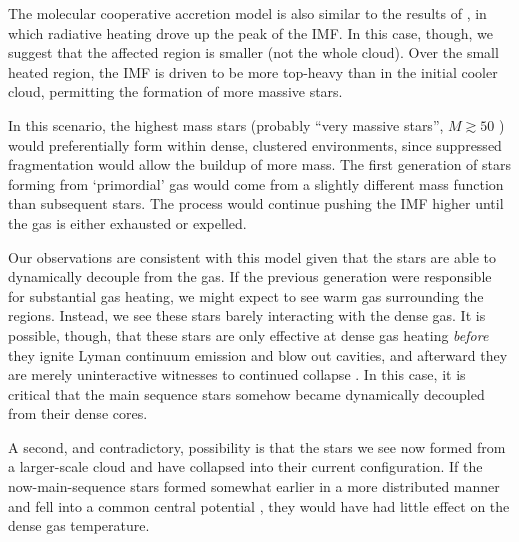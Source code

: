 \documentclass[twocolumn]{aastex61}
\begin{document}

The molecular cooperative accretion model is also similar to the results of
\citet{Krumholz2011a}, in which radiative heating drove up the peak of the IMF.
In this case, though, we suggest that the affected region is smaller (not the
whole cloud).  Over the small heated region, the IMF is driven to be more
top-heavy than in the initial cooler cloud, permitting the formation of more
massive stars.

In this scenario, the highest mass stars (probably ``very massive stars'',
$M\gtrsim50$ \msun) would preferentially form within dense, clustered
environments, since suppressed fragmentation would allow the buildup of
more mass.  The first generation of stars forming from `primordial' gas
would come from a slightly different mass function than subsequent stars.  The
process would continue pushing the IMF higher until the gas is either exhausted
\citep{Kruijssen2012b,Ginsburg2016b} or expelled.

Our observations are consistent with this model given that the stars are able
to dynamically decouple from the gas.  If the previous generation were
responsible for substantial gas heating, we might expect to see warm gas
surrounding the \hchii regions.  Instead, we see these stars barely interacting
with the dense gas.  It is possible, though, that these stars are only
effective at dense gas heating \emph{before} they ignite Lyman continuum
emission and blow out cavities, and afterward they are merely uninteractive
witnesses to continued collapse \citep{Peters2010c}.  In this case, it is
critical that the main sequence stars somehow became dynamically decoupled from
their dense cores.


A second, and contradictory, possibility is that the stars we see now formed
from a larger-scale cloud and have collapsed into their current configuration.
If the now-main-sequence stars formed somewhat earlier in a more distributed
manner and fell into a common central potential \citep[e.g., the `conveyor
belt' scenario for cluster
formation,][]{Ginsburg2012a,Longmore2014a,Walker2016a}, they would have had
little effect on the dense gas temperature.
\end{document}
